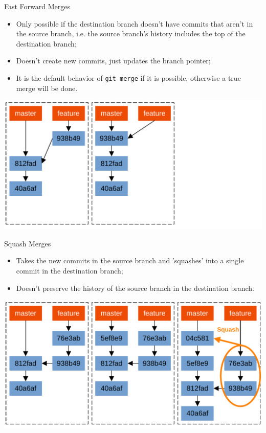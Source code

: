 \documentclass{beamer}
\begin{document}
\begin{frame}{Fast Forward Merges}
  \begin{itemize}
    \item Only possible if the destination branch doesn't have commits that aren't in the source branch, i.e. the source branch's history includes the top of the destination branch;
    \item Doesn't create new commits, just updates the branch pointer;
    \item It is the default behavior of \texttt{git merge} if it is possible, otherwise a true merge will be done.
  \end{itemize}
  \begin{center}
    \includegraphics[scale=0.5]{git-fast-forward-merge}
  \end{center}
\end{frame}

\begin{frame}{Squash Merges}
  \begin{itemize}
    \item Takes the new commits in the source branch and 'squashes' into a single commit in the destination branch;
    \item Doesn't preserve the history of the source branch in the destination branch.
  \end{itemize}
  \begin{center}
    \includegraphics[scale=0.5]{git-squash-merge}
  \end{center}
\end{frame}
\end{document}
